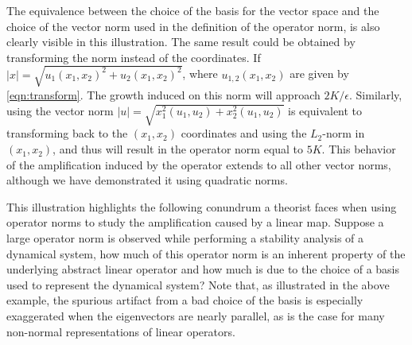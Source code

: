 \documentclass[letterpaper,prl,aps,twocolumn,reprint,superscriptaddress]{revtex4-1}
\begin{document}
The equivalence between the choice of the basis for the vector space and the choice of the vector norm used in the definition of the operator norm, is also clearly visible in this illustration. The same result could be obtained by transforming the norm instead of the coordinates. If $|x| = \sqrt{u_1(x_1,x_2)^2 + u_2(x_1,x_2)^2}$, where $u_{1,2}(x_1, x_2)$ are given by \eqref{eqn:transform}. The growth induced on this norm will approach $2K/\epsilon$. Similarly, using the vector norm $|u| = \sqrt{x_1^2(u_1,u_2)+x_2^2(u_1,u_2)}$ is equivalent to transforming back to the $(x_1, x_2)$ coordinates and using the $L_2$-norm in $(x_1, x_2)$, and thus will result in the operator norm equal to $5K$. This behavior of the amplification induced by the operator extends to all other vector norms, although we have demonstrated it using quadratic norms.

This illustration highlights the following conundrum a theorist faces when using operator norms to study the amplification caused by a linear map. Suppose a large operator norm is observed while performing a stability analysis of a dynamical system, how much of this operator norm is an inherent property of the underlying abstract linear operator and how much is due to the choice of a basis used to represent the dynamical system? Note that, as illustrated in the above example, the spurious artifact from a bad choice of the basis is especially exaggerated when the eigenvectors are nearly parallel, as is the case for many non-normal representations of linear operators.
\end{document}
